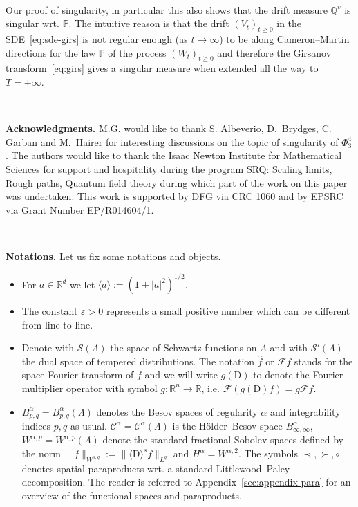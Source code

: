 \documentclass[11pt]{article}
\newcommand{\assign}{:=}
\newcommand{\mathD}{\mathrm{D}}
\newcommand{\tmtextbf}[1]{{\bfseries{#1}}}
\newenvironment{itemizedot}{\begin{itemize} \renewcommand{\labelitemi}{$\bullet$}\renewcommand{\labelitemii}{$\bullet$}\renewcommand{\labelitemiii}{$\bullet$}\renewcommand{\labelitemiv}{$\bullet$}}{\end{itemize}}
\newcommand{\VV}{\mathscr{C}}
\newcommand{\CF}{\mathscr{F}}
\newcommand{\CS}{\mathscr{S}}
\begin{document}
\

Our proof of singularity, in particular this also shows that the drift
measure $\mathbb{Q}^v$ is singular wrt. $\mathbb{P}$. The intuitive reason is
that the drift $(V_t)_{t \geqslant 0}$ in the SDE~{\eqref{eq:sde-girs}} is not
regular enough (as $t \rightarrow \infty$) to be along Cameron--Martin
directions for the law $\mathbb{P}$ of the process $(W_t)_{t \geqslant 0}$ and
therefore the Girsanov transform~{\eqref{eq:girs}} gives a singular measure
when extended all the way to $T = + \infty$.

\



{\noindent}\tmtextbf{Acknowledgments.} M.G. would like to thank S. Albeverio,
D.~Brydges, C. Garban and M.~Hairer for interesting discussions on the topic
of singularity of $\Phi^4_3$. The authors would like to thank the Isaac Newton
Institute for Mathematical Sciences for support and hospitality during the
program SRQ: Scaling limits, Rough paths, Quantum field theory during which
part of the work on this paper was undertaken. This work is supported by DFG
via CRC 1060 and by EPSRC via Grant Number EP/R014604/1.

\

{\noindent}\tmtextbf{Notations.} Let us fix some notations and objects.
\begin{itemizedot}
  \item For $a \in \mathbb{R}^d$ we let $\langle a \rangle \assign (1 + | a
  |^2)^{1 / 2}$.
  
  \item The constant $\varepsilon > 0$ represents a small positive number
  which can be different from line to line.
  
  \item Denote with $\CS (\Lambda)$ the space of Schwartz functions on
  $\Lambda$ and with $\CS' (\Lambda)$ the dual space of tempered
  distributions. The notation $\hat{f}$ or $\CF f$ stands for the space
  Fourier transform of $f$ and we will write $g (\mathD)$ to denote the
  Fourier multiplier operator with symbol $g : \mathbb{R}^n \rightarrow
  \mathbb{R}$, i.e. $\CF (g (\mathD) f) = g \CF f$.
  
  \item $B^{\alpha}_{p, q} = B^{\alpha}_{p, q} (\Lambda)$ denotes the Besov
  spaces of regularity $\alpha$ and integrability indices $p, q$ as usual.
  $\VV^{\alpha} = \VV^{\alpha} (\Lambda)$ is the H{\"o}lder--Besov space
  $B^{\alpha}_{\infty, \infty}$, $W^{\alpha, p} = W^{\alpha, p} (\Lambda)$
  denote the standard fractional Sobolev spaces defined by the norm $\| f
  \|_{W^{s, q}} \assign \| \langle \mathD \rangle^s f \|_{L^q}$ and
  $H^{\alpha} = W^{\alpha, 2}$. The symbols $\prec, \succ, \circ$ denotes
  spatial paraproducts wrt. a standard Littlewood--Paley decomposition. The
  reader is referred to Appendix~\ref{sec:appendix-para} for an overview of
  the functional spaces and paraproducts.
\end{itemizedot}
\end{document}
